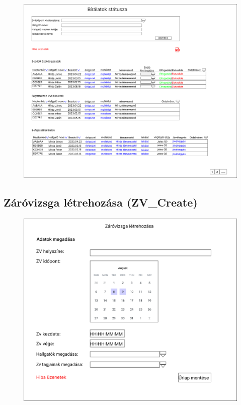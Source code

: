 \documentclass[a4paper,12pt]{article}
\begin{document}
\begin{figure}
	\centering
	\includegraphics[width=\textwidth]{images/Web_pages/Report_Status.jpg}
	\caption{}
	\label{fig:Report_Status}
\end{figure}

\subsection{Záróvizsga létrehozása (ZV\_Create)}

\begin{figure}
	\centering
	\includegraphics[width=\textwidth]{images/Web_pages/ZV_Create.jpg}
	\caption{}
	\label{fig:ZV_Create}
\end{figure}
\end{document}
